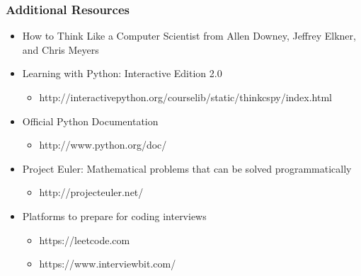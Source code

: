 \documentclass[10pt, a4paper]{beamer} %
\begin{document}
\begin{frame}[c]\frametitle{Additional Resources}
\begin{itemize}
    \item How to Think Like a Computer Scientist from Allen Downey, Jeffrey Elkner, and Chris Meyers
    \item Learning with Python: Interactive Edition 2.0
    \begin{itemize}
        \item http://interactivepython.org/courselib/static/thinkcspy/index.html
    \end{itemize}

    \item Official Python Documentation
    \begin{itemize}
        \item http://www.python.org/doc/
    \end{itemize}

\item Project Euler: Mathematical problems that can be solved
programmatically
\begin{itemize}
    \item http://projecteuler.net/
\end{itemize}

\item Platforms to prepare for coding interviews
\begin{itemize}
    \item https://leetcode.com
    \item https://www.interviewbit.com/
\end{itemize}

\end{itemize}

\end{frame}
\end{document}

